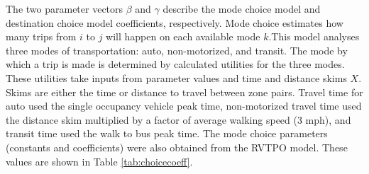 \documentclass[fancy, masters]{byuthesis}
\begin{document}
The two parameter vectors \(\beta\) and \(\gamma\) describe the mode choice model and destination choice model coefficients, respectively. Mode choice estimates how many trips from \(i\) to \(j\) will happen on each available mode \(k\).This model analyses three modes of transportation: auto, non-motorized, and transit. The mode by which a trip is made is determined by calculated utilities for the three modes. These utilities take inputs from parameter values and time and distance skims \(X\). Skims are either the time or distance to travel between zone pairs. Travel time for auto used the single occupancy vehicle peak time, non-motorized travel time used the distance skim multiplied by a factor of average walking speed (3 mph), and transit time used the walk to bus peak time. The mode choice parameters (constants and coefficients) were also obtained from the RVTPO model. These values are shown in Table \ref{tab:choicecoeff}.
\end{document}
